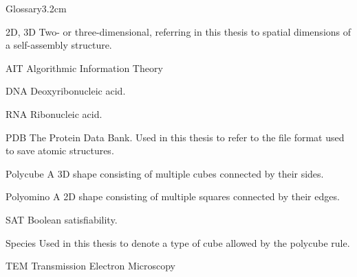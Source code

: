 \begin{mclistof}{Glossary}{3.2cm}

\item[2D, 3D] Two- or three-dimensional, referring in this thesis to spatial dimensions of a self-assembly structure.
\item[AIT] Algorithmic Information Theory
\item[DNA] Deoxyribonucleic acid.
\item[RNA] Ribonucleic acid.
\item[PDB] The Protein Data Bank. Used in this thesis to refer to the file format used to save atomic structures.
\item[Polycube] A 3D shape consisting of multiple cubes connected by their sides.
\item[Polyomino] A 2D shape consisting of multiple squares connected by their edges.
\item[SAT] Boolean satisfiability.
\item[Species] Used in this thesis to denote a type of cube allowed by the polycube rule.
\item[TEM] Transmission Electron Microscopy 

\end{mclistof} 
